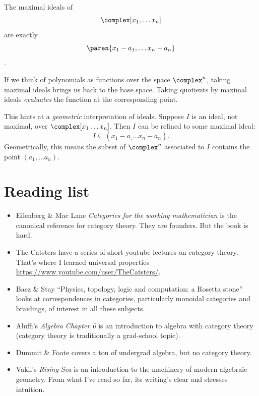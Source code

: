 \documentclass[a5paper]{scrartcl}
\def\book#1{\textit{#1}}
\begin{document}
\begin{theorem}
  The maximal ideals of
  \[
    \complex[x_1,\dots x_n]
  \]
  are exactly
  \[
    \paren{x_1-a_1,\dots x_n-a_n}
  \]
  \cite[107]{rising-sea2024}.
\end{theorem}
If we think of polynomials as functions over the space \(\complex^n\), taking maximal ideals brings us back to the base space. Taking quotients by maximal ideals \emph{evaluates} the function at the corresponding point.

This hints at a \emph{geometric} interpretation of ideals. Suppose \(I\) is an ideal, not maximal, over \(\complex[x_1\dots x_n]\). Then \(I\) can be refined to some maximal ideal:
\[
  I\subseteq (x_1-a_,\dots x_n-a_n).
\]
Geometrically, this means the subset of \(\complex^n\) associated to \(I\) contains the point \((a_1,\dots a_n)\).
\section{Reading list}
\begin{itemize}
  \item Eilenberg \& Mac Lane \book{Categories for the working mathematician} \cite{working} is the canonical reference for category theory. They are founders. But the book is hard.
  \item The Catsters have a series of short youtube lectures on category theory. That's where I learned universal properties \url{https://www.youtube.com/user/TheCatsters/}.
  \item Baez \& Stay ``Physics, topology, logic and computation: a Rosetta stone'' \cite{rosetta} looks at correspondences in categories, particularly monoidal categories and braidings, of interest in all these subjects.
  \item Aluffi's \book{Algebra Chapter 0} is an introduction to algebra with category theory (category theory is traditionally a grad-school topic).

  \item Dummit \& Foote \cite{dummit+foote} covers a ton of undergrad algebra, but no category theory.

  \item Vakil's \book{Rising Sea} is an introduction to the machinery of modern algebraic geometry. From what I've read so far, its  writing's clear and stresses intuition.
\end{itemize}
\printbibliography
\end{document}
